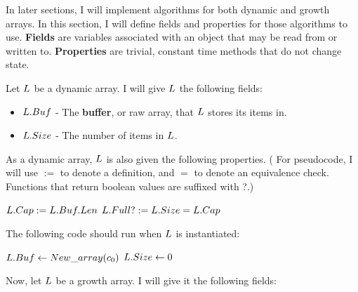 In later sections, I will implement algorithms for both dynamic and growth arrays. In this section, I will define fields and properties for those algorithms to use. \textbf{Fields} are variables associated with an object that may be read from or written to. \textbf{Properties} are trivial, constant time methods that do not change state.

Let $\VarList$ be a dynamic array. I will give $\VarList$ the following fields:

\begin{itemize}
	\item $L.Buf$ - The \textbf{buffer}, or raw array, that $\VarList$ stores its items in.
	\item $L.Size$ - The number of items in $\VarList$.
\end{itemize}

As a dynamic array, $\VarList$ is also given the following properties. ({\HdrNote} For pseudocode, I will use $:=$ to denote a definition, and $=$ to denote an equivalence check. Functions that return boolean values are suffixed with ?.)

\begin{algorithm}
	\begin{algorithmic}
		\State $L.Cap := L.Buf.Len$
		\State
		\State $L.Full? := L.Size = L.Cap$
	\end{algorithmic}
\end{algorithm}

The following code should run when $\VarList$ is instantiated:

\begin{algorithm}
	\begin{algorithmic}
		\Procedure{$\FuncConstructor$}{$\VarList$}
			\State $L.Buf \gets New\_array(c_0)$
			\State $L.Size \gets 0$
		\EndProcedure
	\end{algorithmic}
\end{algorithm}

Now, let $\VarList$ be a growth array. I will give it the following fields:

